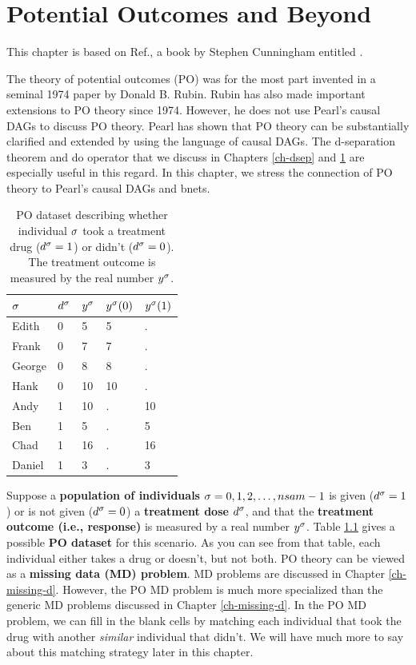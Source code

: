 
\chapter{Potential Outcomes and Beyond}
\label{ch-pot-out}
This chapter
is based on Ref.\cite{book-mixtape},
a book by Stephen Cunningham entitled
.

The theory of potential
outcomes (PO) was for the most part
invented in a seminal
1974 paper by Donald B. Rubin. Rubin
has also
made important extensions
to PO theory since 1974. However, he
does not
use Pearl's causal DAGs to discuss PO theory.
Pearl has shown that PO theory
can be substantially clarified
and extended by using
the language of causal DAGs.
The d-separation theorem and do operator
that we discuss in  Chapters \ref{ch-dsep}
and \ref{ch-pot-out}
are especially
useful in this regard.
In this chapter, we stress the
connection
of PO theory to
Pearl's causal DAGs
and bnets.

\begin{table}[h!]
\centering
\begin{tabular}{|l|l|l|l|l|}
\hline
\rowcolor[HTML]{ECF4FF}
$\sigma$ & $ d^\sigma$ & $ y^\sigma$ & $ y^\sigma(0)$ & $ y^\sigma(1)$ \\ \hline
Edith & 0 & 5 & 5 & . \\ \hline
Frank & 0 & 7 & 7 & . \\ \hline
George & 0 & 8 & 8 & . \\ \hline
Hank & 0 & 10 & 10 & . \\ \hline
Andy & \cellcolor[HTML]{FFFFC7}1 & 10 & . & 10 \\ \hline
Ben & \cellcolor[HTML]{FFFFC7}1 & 5 & . & 5 \\ \hline
Chad & \cellcolor[HTML]{FFFFC7}1 & 16 & . & 16 \\ \hline
Daniel & \cellcolor[HTML]{FFFFC7}1 & 3 & . & 3 \\ \hline
\end{tabular}
\caption{PO dataset describing whether
individual $\sigma$
took a treatment drug ($d^\sigma=1$)
or didn't ($d^\sigma=0$).
The
treatment outcome
is measured by the real number $y^\sigma$.}
\label{tab-pot-out-missing}
\end{table}

Suppose a {\bf population
of individuals} $\sigma=0,1,2, \ldots, nsam-1$
is given ($d^\sigma=1$) or is
not given ($d^\sigma=0$)
a {\bf treatment dose} $d^\sigma$,
and that
the
 {\bf treatment outcome (i.e., response)}
is measured by
a real number $y^\sigma$.
Table \ref{tab-pot-out-missing}
gives a possible {\bf PO dataset}
for this scenario.
As you
can see from
that table,
each individual
either takes a drug or
doesn't,
but not both.
PO theory
can be viewed as a
 {\bf  missing
data (MD) problem}. MD problems are
discussed in
 Chapter \ref{ch-missing-d}.
However, the PO MD problem
is much more specialized
than the generic MD problems
discussed in Chapter \ref{ch-missing-d}.
In the PO MD
problem, we can
fill
in the blank cells
by matching
each individual
that took
the drug with
another {\it similar}
individual that didn't.
We will have much
more to say about
this matching
strategy later in this chapter.

